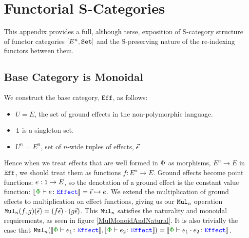

    \chapter{Functorial S-Categories}
    This appendix provides a full, although terse, exposition of S-category structure of functor categories $[E^n, \set]$ and the S-preserving nature of the re-indexing functors between them.
    
    \section{Base Category is Monoidal}
    
    We construct the base category, $\Eff$, as follows:
    
    \begin{itemize}
        \item $U = E$, the set of ground effects in the non-polymorphic language.
        \item $\1$ is a singleton set.
        \item $U^n = E^n$, set of $n$-wide tuples of effects, $\vec{\e}$
    \end{itemize}
    
    Hence when we treat effects that are well formed in $\P$ as morphisms, $E^n \rightarrow E$ in $\Eff$, we should treat them as functions $f: E^n \rightarrow E$. Ground effects become point functions: $e: \1 \rightarrow E$, so the denotation of a ground effect is the constant value function: $\deno{\typerelation{\P}{e}{\effect}} = \ev \mapsto e$. We extend the multiplication of ground effects to multiplication on effect functions, giving us our $\Mul_n$ operation $\Mul_n(f, g)(\ev) = (f\ev)\dot(g\ev)$. This $\Mul_n$ satisfies the naturality and monoidal requirements, as seen in figure \ref{MulMonoidAndNatural}. It is also trivially the case that $\Mul_n(\deno{\typerelation{\P}{e_1}{\effect}}, \deno{\typerelation{\P}{e_2}{\effect}}) = \deno{\typerelation{\P}{e_1\dot e_2}{\effect}}$.
    
